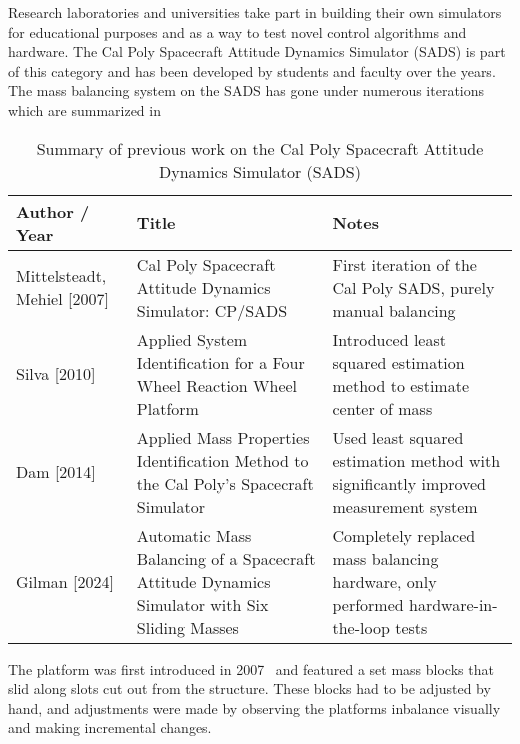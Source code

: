 Research laboratories and universities take part in building their own simulators for educational purposes and as a way to test novel control algorithms and hardware. The Cal Poly Spacecraft Attitude Dynamics Simulator (SADS) is part of this category and has been developed by students and faculty over the years. The mass balancing system on the SADS has gone under numerous iterations which are summarized in 

\begin{table}[h!]
\caption{Summary of previous work on the Cal Poly Spacecraft Attitude Dynamics Simulator (SADS)}
\label{table:sads_history}
\centering
\renewcommand{\arraystretch}{1.4} %

\begin{tabularx}{\textwidth}{
    >{\raggedright\arraybackslash}p{4cm}   %
    >{\raggedright\arraybackslash}p{5cm}   %
    >{\raggedright\arraybackslash}X}       %
\hline
\textbf{Author / Year} & \textbf{Title} & \textbf{Notes} \\
\hline
Mittelsteadt, Mehiel [2007] & 
Cal Poly Spacecraft Attitude Dynamics Simulator: CP/SADS & 
First iteration of the Cal Poly SADS, purely manual balancing \\
[2.0em]

Silva [2010] & 
Applied System Identification for a Four Wheel Reaction Wheel Platform & 
Introduced least squared estimation method to estimate center of mass \\
[2.0em]

Dam [2014] & 
Applied Mass Properties Identification Method to the Cal Poly's Spacecraft Simulator & 
Used least squared estimation method with significantly improved measurement system \\
[2.0em]

Gilman [2024] & 
Automatic Mass Balancing of a Spacecraft Attitude Dynamics Simulator with Six Sliding Masses & 
Completely replaced mass balancing hardware, only performed hardware-in-the-loop tests \\
\hline
\end{tabularx}
\end{table}

The platform was first introduced in 2007~\cite{mittelsteadt_cal_2007} and featured a set mass blocks that slid along slots cut out from the structure. These blocks had to be adjusted by hand, and adjustments were made by observing the platforms inbalance visually and making incremental changes.

